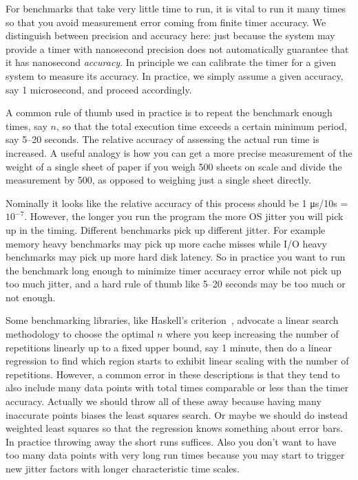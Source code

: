 \documentclass[conference]{IEEEtran}
\begin{document}
For benchmarks that take very little time to run, it is vital to run it many times so that you avoid measurement error coming from finite timer accuracy. We distinguish between precision and accuracy here: just because the system may provide a timer with nanosecond precision does not automatically guarantee that it has nanosecond \textit{accuracy}. In principle we can calibrate the timer for a given system to measure its accuracy. In practice, we simply assume a given accuracy, say 1 microsecond, and proceed accordingly.

A common rule of thumb used in practice is to repeat the benchmark enough times, say $n$, so that the total execution time exceeds a certain minimum period, say 5--20 seconds. The relative accuracy of assessing the actual run time is increased. A useful analogy is how you can get a more precise measurement of the weight of a single sheet of paper if you weigh 500 sheets on scale and divide the measurement by 500, as opposed to weighing just a single sheet directly.

Nominally it looks like the relative accuracy of this process should be 1 μs/10s = $10^{-7}$. However, the longer you run the program the more OS jitter you will pick up in the timing. Different benchmarks pick up different jitter. For example memory heavy benchmarks may pick up more cache misses while I/O heavy benchmarks may pick up more hard disk latency. So in practice you want to run the benchmark long enough to minimize timer accuracy error while not pick up too much jitter, and a hard rule of thumb like 5--20 seconds may be too much or not enough.

Some benchmarking libraries, like Haskell's criterion~\cite{criterion},
advocate a linear search methodology to choose the optimal $n$ where you keep increasing the number of repetitions linearly up to a fixed upper bound, say 1 minute, then do a linear regression to find which region starts to exhibit linear scaling with the number of repetitions. However, a common error in these descriptions is that they tend to also include many data points with total times comparable or less than the timer accuracy. Actually we should throw all of these away because having many inaccurate points biases the least squares search. Or maybe we should do instead weighted least squares so that the regression knows something about error bars. In practice throwing away the short runs suffices. Also you don't want to have too many data points with very long run times because you may start to trigger new jitter factors with longer characteristic time scales.
\end{document}
